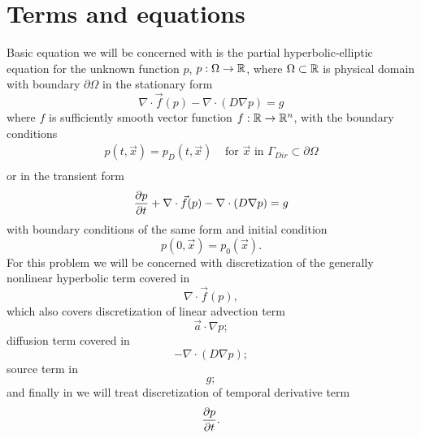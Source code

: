 \providecommand{\elint}{\int_{T^k}}
\providecommand{\elbint}{\int_{\partial T^k}}
\section{Terms and equations}
Basic equation we will be concerned with is the partial hyperbolic-elliptic 
equation for the unknown function $p$, $p : \Omega \rightarrow \mathbb{R}$, where 
$\Omega \subset \mathbb{R}$ is physical domain with boundary $\partial\Omega$ in 
the stationary form
\begin{equation}
\label{eq:hyp_diff}
\nabla\cdot \vec{f}(p) -  \nabla \cdot (D \nabla p) = g
\end{equation}
where $f$ is sufficiently smooth vector function $f: \mathbb{R} 
\rightarrow\mathbb{R}^n$, with the boundary conditions
\begin{align}\label{eq:diff_bcs}
p(t, \vec{x}) = p_D(t, \vec{x}) & \text{ for } \vec{x} \text{ in } 
                \Gamma_{Dir} \subset \partial\Omega \\
\end{align}
or in the transient form
\begin{equation}
    \label{eq:hyp_diff_trans}
    \frac{\partial p}{\partial t} + \nabla\cdot \vec{f}(p) -  \nabla \cdot (D \nabla p) = g
\end{equation}
with boundary conditions of the same form and initial condition
\begin{equation}
    \label{eq:diff_ic}
    p(0, \vec{x}) = p_0(\vec{x}).
\end{equation}
For this problem we will be concerned with discretization of the generally 
nonlinear hyperbolic term covered in 
\begin{equation}
    \nabla\cdot \vec{f}(p),
\end{equation}
which also covers discretization of linear advection term
\begin{equation}
\vec{a} \cdot \nabla p;
\end{equation}
diffusion term covered in 
\begin{equation}
    -  \nabla \cdot (D \nabla p);
\end{equation}
source term in 
\begin{equation}
    g;
\end{equation}
and finally in  we will 
treat discretization of temporal derivative term
\begin{equation}
\frac{\partial p}{\partial t}.
\end{equation}


